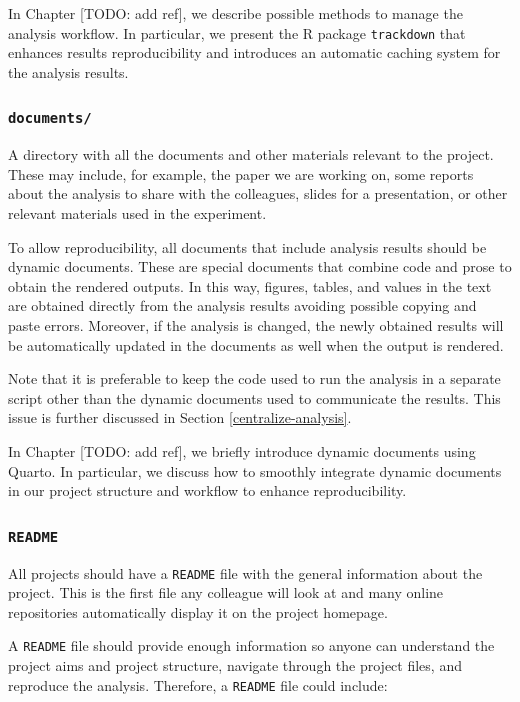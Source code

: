 \documentclass[
  11pt,
]{book}
\begin{document}
In Chapter {[}TODO: add ref{]}, we describe possible methods to manage the analysis workflow. In particular, we present the R package \texttt{trackdown} that enhances results reproducibility and introduces an automatic caching system for the analysis results.

\hypertarget{documents}{%
\subsubsection{\texorpdfstring{\texttt{documents/}}{documents/}}\label{documents}}

A directory with all the documents and other materials relevant to the project. These may include, for example, the paper we are working on, some reports about the analysis to share with the colleagues, slides for a presentation, or other relevant materials used in the experiment.

To allow reproducibility, all documents that include analysis results should be dynamic documents. These are special documents that combine code and prose to obtain the rendered outputs. In this way, figures, tables, and values in the text are obtained directly from the analysis results avoiding possible copying and paste errors. Moreover, if the analysis is changed, the newly obtained results will be automatically updated in the documents as well when the output is rendered.

Note that it is preferable to keep the code used to run the analysis in a separate script other than the dynamic documents used to communicate the results. This issue is further discussed in Section \ref{centralize-analysis}.

In Chapter {[}TODO: add ref{]}, we briefly introduce dynamic documents using Quarto. In particular, we discuss how to smoothly integrate dynamic documents in our project structure and workflow to enhance reproducibility.

\hypertarget{readme}{%
\subsubsection{\texorpdfstring{\texttt{README}}{README}}\label{readme}}

All projects should have a \texttt{README} file with the general information about the project. This is the first file any colleague will look at and many online repositories automatically display it on the project homepage.

A \texttt{README} file should provide enough information so anyone can understand the project aims and project structure, navigate through the project files, and reproduce the analysis. Therefore, a \texttt{README} file could include:
\end{document}
